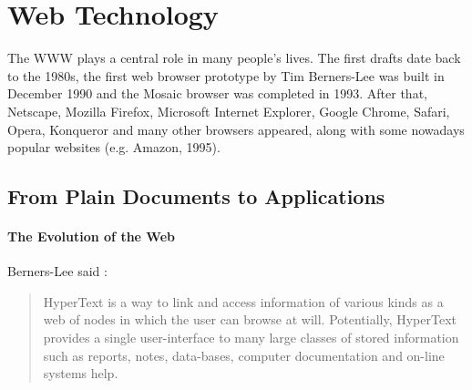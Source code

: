 





\section{Web Technology}
The \ac{WWW} plays a central role in many people's lives.
The first drafts date back to the 1980s, the first web browser prototype by Tim Berners-Lee was built in December 1990 and the Mosaic browser was completed in 1993.
After that, Netscape, Mozilla Firefox, Microsoft Internet Explorer, Google Chrome, Safari, Opera, Konqueror and many other browsers appeared, along with some nowadays popular websites (e.g. Amazon, 1995).

\subsection{From Plain Documents to Applications}
\paragraph{The Evolution of the Web}
Berners-Lee said \cite{BernersLee:1990}:
\begin{quote} 
HyperText is a way to link and access information of various kinds as a web of nodes in which the user can browse at will. 
Potentially, HyperText provides a single user-interface to many large classes of stored information such as reports, notes, data-bases, computer documentation and on-line systems help.
\end{quote} 

